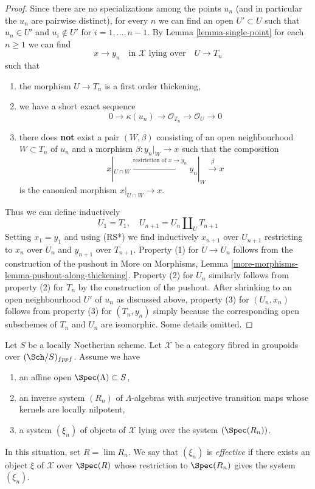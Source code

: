 \begin{proof}
Since there are no specializations among the points $u_n$ (and in
particular the $u_n$ are pairwise distinct), for every $n$
we can find an open $U' \subset U$
such that $u_n \in U'$ and $u_i \not \in U'$ for $i = 1, \ldots, n - 1$.
By Lemma \ref{lemma-single-point} for each $n \geq 1$ we can find
$$
x \to y_n
\quad\text{in }\mathcal{X}\text{ lying over}\quad
U \to T_n
$$
such that
\begin{enumerate}
\item the morphism $U \to T_n$ is a first order thickening,
\item we have a short exact sequence
$$
0 \to \kappa(u_n) \to \mathcal{O}_{T_n} \to \mathcal{O}_U \to 0
$$
\item there does {\bf not} exist a pair $(W, \beta)$
consisting of an open neighbourhood $W \subset T_n$ of $u_n$
and a morphism $\beta : y_n|_W \to x$ such that the composition
$$
x|_{U \cap W} \xrightarrow{\text{restriction of }x \to y_n}
y_n|_W \xrightarrow{\beta} x
$$
is the canonical morphism $x|_{U \cap W} \to x$.
\end{enumerate}
Thus we can define inductively
$$
U_1 = T_1, \quad
U_{n + 1} = U_n \amalg_U T_{n + 1}
$$
Setting $x_1 = y_1$ and using (RS*) we find inductively
$x_{n + 1}$ over $U_{n + 1}$ restricting to
$x_n$ over $U_n$ and $y_{n + 1}$ over $T_{n + 1}$.
Property (1) for $U \to U_n$ follows from the construction
of the pushout in More on Morphisms, Lemma
\ref{more-morphisms-lemma-pushout-along-thickening}.
Property (2) for $U_n$ similarly follows from
property (2) for $T_n$ by the construction of the pushout.
After shrinking to an open neighbourhood $U'$ of $u_n$
as discussed above, property (3) for $(U_n, x_n)$ follows from property (3)
for $(T_n, y_n)$ simply because the corresponding open subschemes
of $T_n$ and $U_n$ are isomorphic. Some details omitted.
\end{proof}

\begin{remark}
\label{remark-strong-effectiveness}
Let $S$ be a locally Noetherian scheme.
Let $\mathcal{X}$ be a category fibred in groupoids over $(\Sch/S)_{fppf}$.
Assume we have
\begin{enumerate}
\item an affine open $\Spec(\Lambda) \subset S$,
\item an inverse system $(R_n)$ of $\Lambda$-algebras
with surjective transition maps whose kernels are locally nilpotent,
\item a system $(\xi_n)$ of objects of $\mathcal{X}$ lying
over the system $(\Spec(R_n))$.
\end{enumerate}
In this situation, set $R = \lim R_n$. We say that
$(\xi_n)$ is {\it effective} if there exists an object
$\xi$ of $\mathcal{X}$ over $\Spec(R)$ whose restriction
to $\Spec(R_n)$ gives the system $(\xi_n)$.
\end{remark}

